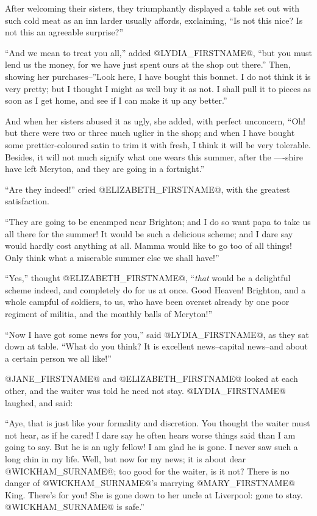 After welcoming their sisters, they triumphantly displayed a table set
out with such cold meat as an inn larder usually affords, exclaiming,
``Is not this nice? Is not this an agreeable surprise?''

``And we mean to treat you all,'' added @LYDIA_FIRSTNAME@, ``but you must lend us the
money, for we have just spent ours at the shop out there.'' Then, showing
her purchases--''Look here, I have bought this bonnet. I do not think
it is very pretty; but I thought I might as well buy it as not. I shall
pull it to pieces as soon as I get home, and see if I can make it up any
better.''

And when her sisters abused it as ugly, she added, with perfect
unconcern, ``Oh! but there were two or three much uglier in the shop; and
when I have bought some prettier-coloured satin to trim it with fresh, I
think it will be very tolerable. Besides, it will not much signify what
one wears this summer, after the ----shire have left Meryton, and they
are going in a fortnight.''

``Are they indeed!'' cried @ELIZABETH_FIRSTNAME@, with the greatest satisfaction.

``They are going to be encamped near Brighton; and I do so want papa to
take us all there for the summer! It would be such a delicious scheme;
and I dare say would hardly cost anything at all. Mamma would like to
go too of all things! Only think what a miserable summer else we shall
have!''

``Yes,'' thought @ELIZABETH_FIRSTNAME@, ``\textit{that} would be a delightful scheme indeed,
and completely do for us at once. Good Heaven! Brighton, and a whole
campful of soldiers, to us, who have been overset already by one poor
regiment of militia, and the monthly balls of Meryton!''

``Now I have got some news for you,'' said @LYDIA_FIRSTNAME@, as they sat down at
table. ``What do you think? It is excellent news--capital news--and about
a certain person we all like!''

@JANE_FIRSTNAME@ and @ELIZABETH_FIRSTNAME@ looked at each other, and the waiter was told he need
not stay. @LYDIA_FIRSTNAME@ laughed, and said:

``Aye, that is just like your formality and discretion. You thought the
waiter must not hear, as if he cared! I dare say he often hears worse
things said than I am going to say. But he is an ugly fellow! I am glad
he is gone. I never saw such a long chin in my life. Well, but now for
my news; it is about dear @WICKHAM_SURNAME@; too good for the waiter, is it not?
There is no danger of @WICKHAM_SURNAME@'s marrying @MARY_FIRSTNAME@ King. There's for you! She
is gone down to her uncle at Liverpool: gone to stay. @WICKHAM_SURNAME@ is safe.''

